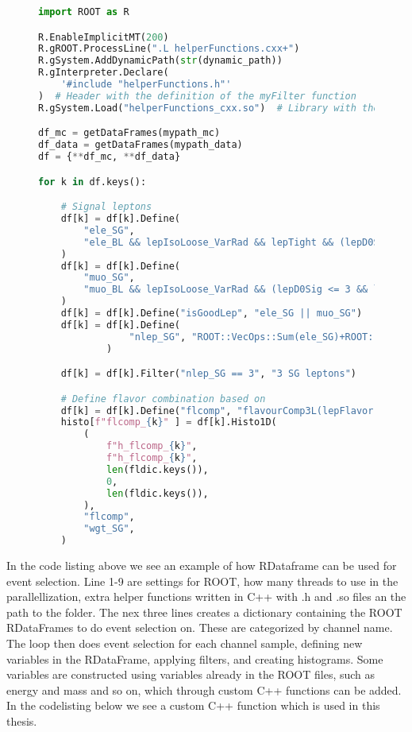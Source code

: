 \begin{figure}[H]
    \centering
\begin{lstlisting}[language=Python, style=pythonstyle, label={code:python_func_example}]
import ROOT as R

R.EnableImplicitMT(200)
R.gROOT.ProcessLine(".L helperFunctions.cxx+")
R.gSystem.AddDynamicPath(str(dynamic_path))
R.gInterpreter.Declare(
    '#include "helperFunctions.h"'
)  # Header with the definition of the myFilter function
R.gSystem.Load("helperFunctions_cxx.so")  # Library with the myFilter function

df_mc = getDataFrames(mypath_mc)
df_data = getDataFrames(mypath_data)
df = {**df_mc, **df_data}

for k in df.keys():

    # Signal leptons
    df[k] = df[k].Define(
        "ele_SG",
        "ele_BL && lepIsoLoose_VarRad && lepTight && (lepD0Sig <= 5 && lepD0Sig >= -5)",
    )  
    df[k] = df[k].Define(
        "muo_SG",
        "muo_BL && lepIsoLoose_VarRad && (lepD0Sig <= 3 && lepD0Sig >= -3)",
    )  
    df[k] = df[k].Define("isGoodLep", "ele_SG || muo_SG")
    df[k] = df[k].Define(
                "nlep_SG", "ROOT::VecOps::Sum(ele_SG)+ROOT::VecOps::Sum(muo_SG)"
            )

    df[k] = df[k].Filter("nlep_SG == 3", "3 SG leptons")

    # Define flavor combination based on 
    df[k] = df[k].Define("flcomp", "flavourComp3L(lepFlavor[ele_SG || muo_SG])")
    histo[f"flcomp_{k}" ] = df[k].Histo1D(
        (
            f"h_flcomp_{k}",
            f"h_flcomp_{k}",
            len(fldic.keys()),
            0,
            len(fldic.keys()),
        ),
        "flcomp",
        "wgt_SG",
    )
    \end{lstlisting}
\end{figure}

In the code listing above we see an example of how RDataframe can be used for event selection. Line 1-9 are settings for ROOT, 
how many threads to use in the parallellization, extra helper functions written in C++ with .h and .so files an the path to the folder.
The nex three lines creates a dictionary containing the ROOT RDataFrames to do event selection on. These are categorized by channel name. 
The loop then does event selection for each channel sample, defining new variables in the RDataFrame, applying filters, and creating histograms.
Some variables are constructed using variables already in the ROOT files, such as energy and mass and so on, which through custom C++ functions
can be added. In the codelisting below we see a custom C++ function which is used in this thesis.

